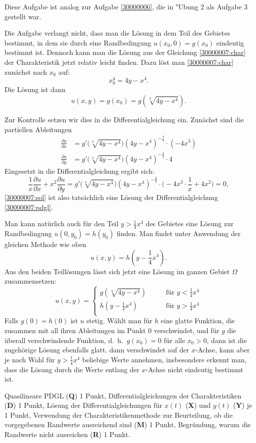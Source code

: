 \begin{diskussion}
Diese Aufgabe ist analog zur Aufgabe \ref{30000006}, die in
"Ubung 2 als Aufgabe 3 gestellt war.

Die Aufgabe verlangt nicht, dass man die Lösung in dem Teil des
Gebietes bestimmt, in dem sie durch eine Randbedingung
$u(x_0,0)=g(x_0)$ eindeutig bestimmt ist. Dennoch kann man die
Lösung aus der Gleichung \eqref{30000007:char} der Charakteristik
jetzt relativ leicht finden. Dazu löst man \eqref{30000007:char}
zunächst nach $x_0$ auf:
\[
x_0^4 = 4y-x^4.
\]
Die Lösung ist dann
\begin{equation}
u(x,y)=g(x_0)
=
g(\sqrt[4]{4y-x^4}).
\label{30000007:sol}
\end{equation}

Zur Kontrolle setzen wir dies in die Differentialgleichung ein.
Zunächst sind die partiellen Ableitungen
\begin{align*}
\frac{\partial u}{\partial x}
&=
g'\bigl(\sqrt[4]{4y-x^4}\bigr) (4y-x^4)^{-\frac34}
\cdot (-4x^3)
\\
\frac{\partial u}{\partial y}
&=
g'\bigl(\sqrt[4]{4y-x^4}\bigr) (4y-x^4)^{-\frac34}
\cdot 4
\end{align*}
Eingesetzt in die Differentialgleichung ergibt sich:
\[
\frac1x\frac{\partial u}{\partial x}+x^2\frac{\partial u}{\partial y}=
g'\bigl(\sqrt[4]{4y-x^4}\bigr) (4y-x^4)^{-\frac34}
\cdot
\biggl(
-4x^3\cdot\frac1x+4x^2
\biggr)=0,
\]
\eqref{30000007:sol} ist also tatsächlich eine Lösung der
Differentialgleichung
\eqref{30000007:pdgl}.

Man kann natürlich auch für den Teil $y>\frac14x^4$ des
Gebietes eine Lösung zur Randbedingung $u(0,y_0)=h(y_0)$ finden.
Man findet unter Anwendung der gleichen Methode wie oben 
\[
u(x,y)=h(y-{\textstyle\frac14}x^4).
\]
Aus den beiden Teillösungen lässt sich jetzt eine Lösung im
ganzen Gebiet $\Omega$ zusammensetzen: 
\[
u(x,y)=\begin{cases}
g(\sqrt[4]{4y-x^4})&\qquad \text{für $y<\frac14x^4$}\\
h(y-\frac14x^4)&\qquad \text{für $y>\frac14x^4$}\\
\end{cases}
\]
Falls $g(0)=h(0)$ ist $u$ stetig. Wählt man für $h$ eine glatte
Funktion, die zusammen mit all ihren Ableitungen im Punkt $0$
verschwindet, und für $g$ die überall verschwindende Funktion,
d.~h.~$g(x_0)=0$ für alle $x_0>0$, dann ist die zugehörige Lösung
ebenfalls glatt. dann verschwindet auf der $x$-Achse,
kann aber je nach Wahl für $y>\frac14x^4$ beliebige Werte
annehmen, insbesondere erkennt man, dass die Lösung durch die
Werte entlang der $x$-Achse nicht eindeutig bestimmt ist.
\end{diskussion}

\begin{bewertung}
Quasilineare PDGL ({\bf Q}) 1 Punkt,
Differentialgleichungen der Charakteristiken ({\bf D}) 1 Punkt,
Lösung der Differentialgleichungen für $x(t)$ ({\bf X}) 
und $y(t)$ ({\bf Y}) je 1 Punkt,
Verwendung der Charakteristikenmethode zur Beurteilung, ob die
vorgegebenen Randwerte ausreichend sind ({\bf M}) 1 Punkt,
Begründung, warum die Randwerte nicht ausreichen ({\bf R}) 1 Punkt.
\end{bewertung}

